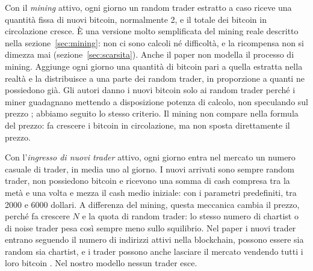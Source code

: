 Con il \textit{mining} attivo, ogni giorno un random trader estratto a caso riceve una quantità fissa di nuovi bitcoin, normalmente 2, e il totale dei bitcoin in circolazione cresce. È una versione molto semplificata del mining reale descritto nella sezione~\ref{sec:mining}: non ci sono calcoli né difficoltà, e la ricompensa non si dimezza mai (sezione~\ref{sec:scarsita}). Anche il paper non modella il processo di mining. Aggiunge ogni giorno una quantità di bitcoin pari a quella estratta nella realtà e la distribuisce a una parte dei random trader, in proporzione a quanti ne possiedono già. Gli autori danno i nuovi bitcoin solo ai random trader perché i miner guadagnano mettendo a disposizione potenza di calcolo, non speculando sul prezzo \cite{paper_riferimento}; abbiamo seguito lo stesso criterio. Il mining non compare nella formula del prezzo: fa crescere i bitcoin in circolazione, ma non sposta direttamente il prezzo.

Con l'\textit{ingresso di nuovi trader} attivo, ogni giorno entra nel mercato un numero casuale di trader, in media uno al giorno. I nuovi arrivati sono sempre random trader, non possiedono bitcoin e ricevono una somma di cash compresa tra la metà e una volta e mezza il cash medio iniziale: con i parametri predefiniti, tra 2000 e 6000 dollari. A differenza del mining, questa meccanica cambia il prezzo, perché fa crescere $N$ e la quota di random trader: lo stesso numero di chartist o di noise trader pesa così sempre meno sullo squilibrio. Nel paper i nuovi trader entrano seguendo il numero di indirizzi attivi nella blockchain, possono essere sia random sia chartist, e i trader possono anche lasciare il mercato vendendo tutti i loro bitcoin \cite{paper_riferimento}. Nel nostro modello nessun trader esce.
